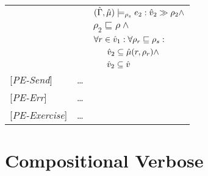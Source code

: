 \documentclass[[12pt,a4paper,twoside,openrigh]{report}
\begin{document}
\begin{tabular} {l l l l}
&&\multicolumn{2}{l}{$ (\hat{\Gamma},\hat{\mu}) \models_{\rho_s} e_2 : \hat{v}_{2} \gg \rho_{2} \wedge $}\\
&&\multicolumn{2}{l}{$\rho_2 \sqsubseteq \rho \wedge$}\\
&&\multicolumn{2}{l}{$\forall r \in \hat{v}_1 : \forall \rho_r \sqsubseteq \rho_s :$}\\
&&&$\hat{v}_2 \subseteq \hat{\mu}(r, \rho_r) \wedge$ \\
&&&$\hat{v}_2 \subseteq \hat{v} $\\
{[\textit{PE-Send}]}& \dots \\
{[\textit{PE-Err}]}& \dots \\
{[\textit{PE-Exercise}]}& \dots \\
\end{tabular}

\section{Compositional Verbose}
\end{document}

